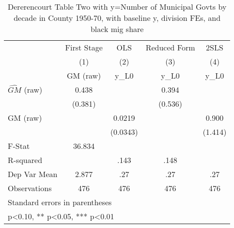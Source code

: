 \begin{table}[htbp]\centering
\def\sym#1{\ifmmode^{#1}\else\(^{#1}\)\fi}
\caption{Dererencourt Table Two with y=Number of Municipal Govts by decade in County 1950-70, with baseline y, division FEs, and black mig share}
\begin{tabular}{l*{4}{c}}
\toprule
                    & First Stage   &         OLS   &Reduced Form   &        2SLS   \\
                    &\multicolumn{1}{c}{(1)}&\multicolumn{1}{c}{(2)}&\multicolumn{1}{c}{(3)}&\multicolumn{1}{c}{(4)}\\
                    &\multicolumn{1}{c}{GM  (raw)}&\multicolumn{1}{c}{y\_L0}&\multicolumn{1}{c}{y\_L0}&\multicolumn{1}{c}{y\_L0}\\
\midrule
$\hat{GM}$ (raw)    &       0.438   &               &       0.394   &               \\
                    &     (0.381)   &               &     (0.536)   &               \\
\addlinespace
GM  (raw)           &               &      0.0219   &               &       0.900   \\
                    &               &    (0.0343)   &               &     (1.414)   \\
\midrule
F-Stat              &      36.834   &               &               &               \\
R-squared           &               &        .143   &        .148   &               \\
Dep Var Mean        &       2.877   &         .27   &         .27   &         .27   \\
Observations        &         476   &         476   &         476   &         476   \\
\bottomrule
\multicolumn{5}{l}{\footnotesize Standard errors in parentheses}\\
\multicolumn{5}{l}{\footnotesize * p<0.10, ** p<0.05, *** p<0.01}\\
\end{tabular}
\end{table}
